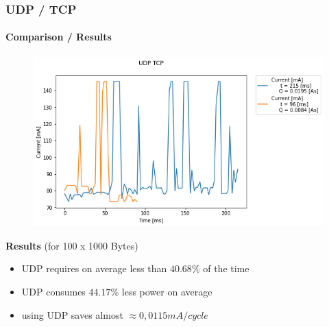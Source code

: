 \begin{frame}
	\frametitle{UDP / TCP}
	\framesubtitle{Comparison / Results}
	\begin{minipage}[c]{0.60 \textwidth}
		\begin{figure}[H]
			\centering
			\includegraphics[width = 0.9 \linewidth]{fig/UDP_TCP/udp_tcp_s_m.png}
		\end{figure}
	\end{minipage}
	\begin{minipage}[r]{0.34 \textwidth}
		\textbf{Results}\linebreak
		(for 100 x 1000 Bytes)
		\begin{itemize}
			\item UDP requires on average less than $40.68\%$ of the time
			\item UDP consumes $44.17\%$ less power on average
			\item using UDP saves almost $\approx 0,0115 mA/ cycle$
		\end{itemize}
	\end{minipage}
\end{frame}
